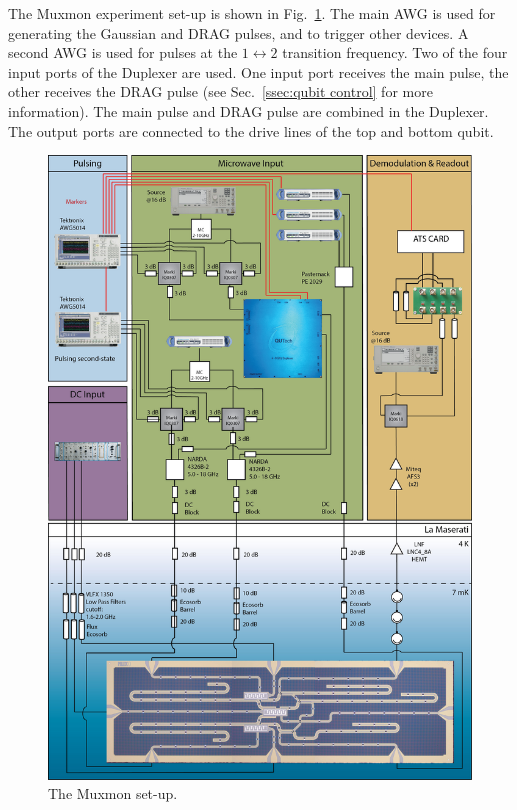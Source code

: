       The Muxmon experiment set-up is shown in Fig.~\ref{fig:Muxmon set-up}. The main AWG is used for generating the Gaussian and DRAG pulses, and to trigger other devices. A second AWG is used for pulses at the $1 \leftrightarrow 2$ transition frequency. Two of the four input ports of the Duplexer are used. One input port receives the main pulse, the other receives the DRAG pulse (see Sec.~\ref{ssec:qubit control} for more information). The main pulse and DRAG pulse are combined in the Duplexer. The output ports are connected to the drive lines of the top and bottom qubit.


      \begin{figure}[tb]
        \centering
        \includegraphics[width=.9\textwidth]{Figures/20150512_Muxmon_Setup.jpg}
        \caption{The Muxmon set-up.}
        \label{fig:Muxmon set-up}
      \end{figure}
